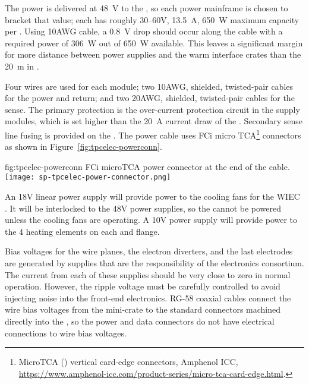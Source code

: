 The  power is delivered at \SI{48}{V} to the , so each  power mainframe is chosen to bracket that value; each has  
roughly \numrange{30}{60}{V}, \SI{13.5}{A}, \SI{650}{W} maximum capacity per . Using 10AWG cable, a \SI{0.8}{V} drop should occur along the cable with a required power of \SI{306}{W} out of \SI{650}{W} available.  
This leaves a significant margin for more distance between power supplies and 
the warm interface crates than the \SI{20}{\meter} in .

Four wires are used for each module; two 10AWG, shielded, twisted-pair cables for the power and return; and two 20AWG, shielded, twisted-pair cables for the sense.
The primary protection is the over-current protection circuit in the  supply modules, 
which is set higher than the \SI{20}{A} current draw of the .  Secondary sense line fusing is 
provided on the .  The  power cable uses FCi micro TCA\footnote{MicroTCA\texttrademark{} () vertical card-edge connectors, Amphenol ICC,  \url{https://www.amphenol-icc.com/product-series/micro-tca-card-edge.html}.} connectors as shown in
Figure~\ref{fig:tpcelec-powerconn}.

\begin{dunefigure}
{fig:tpcelec-powerconn}
{FCi microTCA power connector at the  end of the cable.}
\texttt{[image: sp-tpcelec-power-connector.png]}
\end{dunefigure}

An 18V linear power supply will provide power to the cooling fans for the WIEC . It will be interlocked to the 48V power 
supplies, so the  cannot be powered unless the cooling fans are operating. A 10V power supply will provide
power to the 4 heating elements on each  and  flange.

Bias voltages for the  wire planes, the electron diverters, and the last  electrodes are generated 
by supplies that are the responsibility of the  electronics consortium.  The current from each of these supplies 
should be very close to zero in normal operation.  However, the ripple voltage must be carefully controlled to 
avoid injecting noise into the front-end electronics.  RG-58 coaxial cables connect the wire bias voltages from the 
mini-crate to the standard  connectors machined directly into the  \fdth, so the  power and data connectors do not have electrical connections to wire bias voltages.

